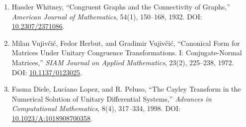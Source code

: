\documentclass[
  a4paper,
]{article}
\providecommand{\tightlist}{%
  \setlength{\itemsep}{0pt}\setlength{\parskip}{0pt}}
\begin{document}
\begin{enumerate}
\def\labelenumi{\arabic{enumi}.}
\setcounter{enumi}{5}
\tightlist
\item
  Hassler Whitney, ``Congruent Graphs and the Connectivity of Graphs,''
  \emph{American Journal of Mathematics}, 54(1), 150--168, 1932. DOI:
  \href{https://doi.org/10.2307/2371086}{10.2307/2371086}.
\item
  Milan Vujivčić, Fedor Herbut, and Gradimir Vujivčić, ``Canonical Form
  for Matrices Under Unitary Congruence Transformations. I:
  Conjugate-Normal Matrices,'' \emph{SIAM Journal on Applied
  Mathematics}, 23(2), 225--238, 1972. DOI:
  \href{https://doi.org/10.1137/0123025}{10.1137/0123025}.
\item
  Fasma Diele, Luciano Lopez, and R. Peluso, ``The Cayley Transform in
  the Numerical Solution of Unitary Differential Systems,''
  \emph{Advances in Computational Mathematics}, 8(4), 317--334, 1998.
  DOI:
  \href{https://doi.org/10.1023/A:1018908700358}{10.1023/A:1018908700358}.
\end{enumerate}
\end{document}
